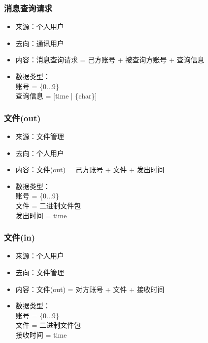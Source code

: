             \subsubsection{消息查询请求}
            \begin{itemize}
                \item 来源：个人用户
                \item 去向：通讯用户
                \item 内容：消息查询请求 = 己方账号 + 被查询方账号 + 查询信息
                \item 数据类型：\\
                      账号 = \{0...9\}\\
                      查询信息 = [time | \{char\}]\\
            \end{itemize}
            \subsubsection{文件(out)}
            \begin{itemize}
                \item 来源：文件管理
                \item 去向：个人用户
                \item 内容：文件(out) = 己方账号 + 文件 + 发出时间
                \item 数据类型：\\
                账号 = \{0...9\}\\
                文件 = 二进制文件包\\
                发出时间 = time\\
            \end{itemize}
            \subsubsection{文件(in)}
            \begin{itemize}
                \item 来源：个人用户
                \item 去向：文件管理
                \item 内容：文件(out) = 对方账号 + 文件 + 接收时间
                \item 数据类型：\\
                账号 = \{0...9\}\\
                文件 = 二进制文件包\\
                接收时间 = time\\
            \end{itemize}
